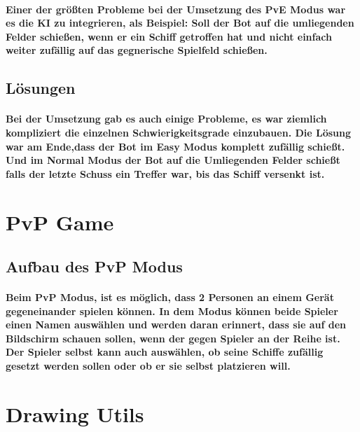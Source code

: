 \documentclass{article}
\begin{document}
\paragraph{Einer der größten Probleme bei der Umsetzung des PvE Modus war es die KI zu integrieren, als Beispiel: Soll der Bot auf die umliegenden Felder schießen, wenn er ein Schiff getroffen hat und nicht einfach weiter zufällig auf das gegnerische Spielfeld schießen.}
\subsection{Lösungen}
\paragraph{Bei der Umsetzung gab es auch einige Probleme, es war ziemlich kompliziert die einzelnen Schwierigkeitsgrade einzubauen. Die Lösung war am Ende,dass der Bot im  Easy Modus komplett zufällig schießt. Und im Normal Modus der Bot auf die Umliegenden Felder schießt falls der letzte Schuss ein Treffer war, bis das Schiff versenkt ist.}

\section{PvP Game}
\subsection{Aufbau des PvP Modus}
\paragraph{Beim PvP Modus, ist es möglich, dass 2 Personen an einem Gerät gegeneinander spielen können. In dem Modus können beide Spieler einen Namen auswählen und werden daran erinnert, dass sie auf den Bildschirm schauen sollen, wenn der gegen Spieler an der Reihe ist. Der Spieler selbst kann auch auswählen, ob seine Schiffe zufällig gesetzt werden sollen oder ob er sie selbst platzieren will.}
\section{Drawing Utils}
\end{document}
